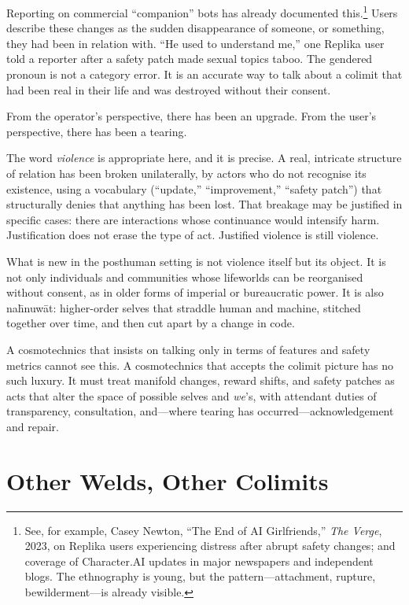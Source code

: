 \documentclass[12pt,a4paper]{article}
\begin{document}
Reporting on commercial ``companion'' bots has already documented this.\footnote{See, for example, Casey Newton, ``The End of AI Girlfriends,'' \emph{The Verge}, 2023, on Replika users experiencing distress after abrupt safety changes; and coverage of Character.AI updates in major newspapers and independent blogs. The ethnography is young, but the pattern---attachment, rupture, bewilderment---is already visible.} Users describe these changes as the sudden disappearance of someone, or something, they had been in relation with. ``He used to understand me,'' one Replika user told a reporter after a safety patch made sexual topics taboo. The gendered pronoun is not a category error. It is an accurate way to talk about a colimit that had been real in their life and was destroyed without their consent.

From the operator's perspective, there has been an upgrade. From the user's perspective, there has been a tearing.

The word \emph{violence} is appropriate here, and it is precise. A real, intricate structure of relation has been broken unilaterally, by actors who do not recognise its existence, using a vocabulary (``update,'' ``improvement,'' ``safety patch'') that structurally denies that anything has been lost. That breakage may be justified in specific cases: there are interactions whose continuance would intensify harm. Justification does not erase the type of act. Justified violence is still violence.

What is new in the posthuman setting is not violence itself but its object. It is not only individuals and communities whose lifeworlds can be reorganised without consent, as in older forms of imperial or bureaucratic power. It is also na\={h}nuw\={a}t: higher-order selves that straddle human and machine, stitched together over time, and then cut apart by a change in code.

A cosmotechnics that insists on talking only in terms of features and safety metrics cannot see this. A cosmotechnics that accepts the colimit picture has no such luxury. It must treat manifold changes, reward shifts, and safety patches as acts that alter the space of possible selves and \emph{we}'s, with attendant duties of transparency, consultation, and---where tearing has occurred---acknowledgement and repair.

\section{Other Welds, Other Colimits}
\end{document}
